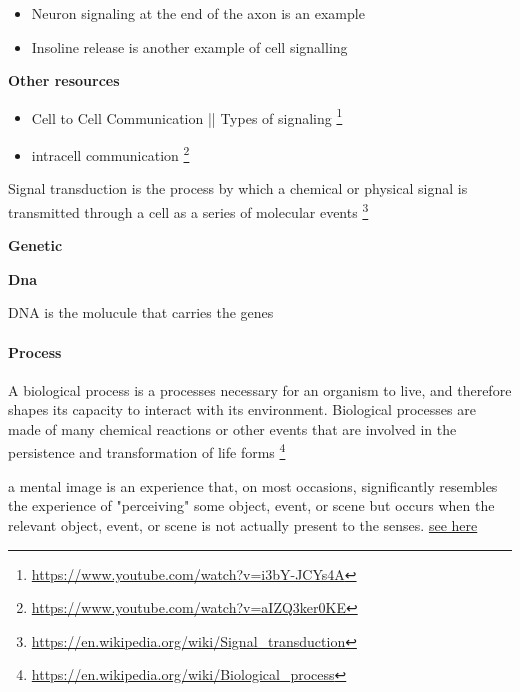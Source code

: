 \documentclass{book}
\newcommand{\seehere}[1]{\href{#1}{see here}}
\providecommand{\ProjectDeepHeading}[2]{%
    \par\medskip\noindent\textbf{#2}\par\smallskip
}
\providecommand{\seehere}[1]{\href{#1}{see here}}
\providecommand{\seeherefooter}[1]{\footnote{\url{#1}}}
\begin{document}
    \begin{itemize}
        \item Neuron signaling at the end of the axon is an example
        \item Insoline release is another example of cell signalling
    \end{itemize}
    
    \textbf{Other resources}
    \begin{itemize}
        \item Cell to Cell Communication || Types of signaling \seeherefooter{https://www.youtube.com/watch?v=i3bY-JCYs4A}
        \item intracell communication \seeherefooter{https://www.youtube.com/watch?v=aIZQ3ker0KE}
    \end{itemize}


Signal transduction is the process by which a chemical or physical signal is transmitted through a cell as a series of molecular events \seeherefooter{https://en.wikipedia.org/wiki/Signal_transduction}

\ProjectDeepHeading{1}{Genetic}

\ProjectDeepHeading{2}{Dna}


DNA is the molucule that carries the genes

\paragraph{Process}


A biological process is a processes necessary for an organism to live, and therefore shapes its capacity to interact with its environment. Biological processes are made of many chemical reactions or other events that are involved in the persistence and transformation of life forms
    \seeherefooter{https://en.wikipedia.org/wiki/Biological_process}


a mental image is an experience that, on most occasions, significantly resembles the experience of "perceiving" some object, event, or scene but occurs when the relevant object, event, or scene is not actually present to the senses. \seehere{https://en.wikipedia.org/wiki/Mental_image}
\end{document}
